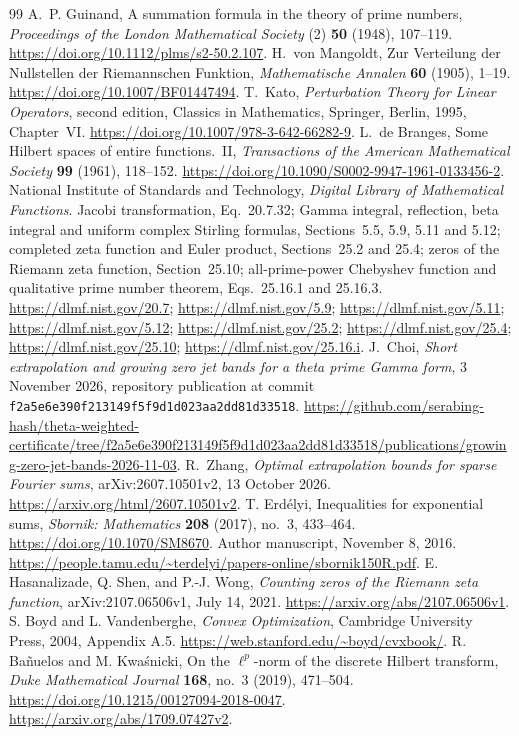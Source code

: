 \documentclass[11pt,a4paper]{article}
\numberwithin{equation}{section}
\theoremstyle{definition}\newtheorem{definition}[theorem]{Definition}
\theoremstyle{remark}\newtheorem{remark}[theorem]{Remark}
\begin{document}
\begin{thebibliography}{99}
A.~P. Guinand, A summation formula in the theory of prime numbers,
\emph{Proceedings of the London Mathematical Society} (2) \textbf{50} (1948), 107--119.
\url{https://doi.org/10.1112/plms/s2-50.2.107}.
H.~von Mangoldt, Zur Verteilung der Nullstellen der Riemannschen Funktion,
\emph{Mathematische Annalen} \textbf{60} (1905), 1--19.
\url{https://doi.org/10.1007/BF01447494}.
T.~Kato, \emph{Perturbation Theory for Linear Operators}, second edition,
Classics in Mathematics, Springer, Berlin, 1995, Chapter~VI.
\url{https://doi.org/10.1007/978-3-642-66282-9}.
L.~de Branges, Some Hilbert spaces of entire functions.~II,
\emph{Transactions of the American Mathematical Society} \textbf{99} (1961), 118--152.
\url{https://doi.org/10.1090/S0002-9947-1961-0133456-2}.
National Institute of Standards and Technology, \emph{Digital Library of Mathematical Functions}.
Jacobi transformation, Eq.~20.7.32; Gamma integral, reflection, beta integral and uniform complex Stirling formulas, Sections~5.5, 5.9, 5.11 and 5.12; completed zeta function and Euler product, Sections~25.2 and 25.4; zeros of the Riemann zeta function, Section~25.10; all-prime-power Chebyshev function and qualitative prime number theorem, Eqs.~25.16.1 and 25.16.3.
\url{https://dlmf.nist.gov/20.7}; \url{https://dlmf.nist.gov/5.9};
\url{https://dlmf.nist.gov/5.11}; \url{https://dlmf.nist.gov/5.12};
\url{https://dlmf.nist.gov/25.2}; \url{https://dlmf.nist.gov/25.4}; \url{https://dlmf.nist.gov/25.10}; \url{https://dlmf.nist.gov/25.16.i}.
J.~Choi, \emph{Short extrapolation and growing zero jet bands for a theta
prime Gamma form}, 3 November 2026, repository publication at commit
\texttt{f2a5e6e390f213149f5f9d1d023aa2dd81d33518}.
\url{https://github.com/serabing-hash/theta-weighted-certificate/tree/f2a5e6e390f213149f5f9d1d023aa2dd81d33518/publications/growing-zero-jet-bands-2026-11-03}.
R.~Zhang, \emph{Optimal extrapolation bounds for sparse Fourier sums},
arXiv:2607.10501v2, 13 October 2026.
\url{https://arxiv.org/html/2607.10501v2}.
T. Erd\'elyi, Inequalities for exponential sums, \emph{Sbornik: Mathematics} \textbf{208} (2017), no.~3, 433--464. \url{https://doi.org/10.1070/SM8670}. Author manuscript, November 8, 2016.
\url{https://people.tamu.edu/~terdelyi/papers-online/sbornik150R.pdf}.
E. Hasanalizade, Q. Shen, and P.-J. Wong, \emph{Counting zeros of the Riemann zeta function}, arXiv:2107.06506v1, July 14, 2021.
\url{https://arxiv.org/abs/2107.06506v1}.
S. Boyd and L. Vandenberghe, \emph{Convex Optimization}, Cambridge University Press, 2004, Appendix A.5.
\url{https://web.stanford.edu/~boyd/cvxbook/}.
R. Ba\~nuelos and M. Kwa\'snicki, On the $\ell^p$-norm of the discrete Hilbert transform,
\emph{Duke Mathematical Journal} \textbf{168}, no.~3 (2019), 471--504.
\url{https://doi.org/10.1215/00127094-2018-0047}.
\url{https://arxiv.org/abs/1709.07427v2}.


\end{thebibliography}
\end{document}
